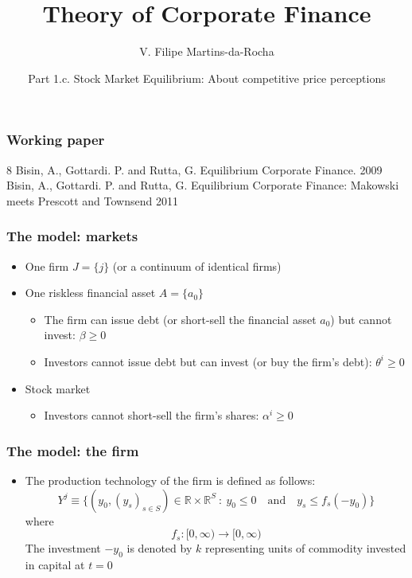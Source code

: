 \documentclass[blue]{beamer}
\title[Corporate Finance]{Theory of Corporate Finance}
\author[Victor Filipe]{V. Filipe Martins-da-Rocha}
\institute[FGV EESP]{Escola de Economia de S\~ao Paulo}
\date[April--June, 2026]{Part 1.c. Stock Market Equilibrium: About competitive price perceptions}
\def\R{\mathbb{R}}
\def\leq{\leqslant}
\def\geq{\geqslant}
\def\et{\quad \textrm{and} \quad}
\theoremstyle{definition}
\theoremstyle{example}
\begin{document}
\frame{\titlepage}
\begin{frame}\frametitle{Working paper}
\begin{thebibliography}{8}
  \beamertemplatearticlebibitems
    Bisin, A., Gottardi. P. and Rutta, G.
    \newblock Equilibrium Corporate Finance.
     2009
    Bisin, A., Gottardi. P. and Rutta, G.
    \newblock Equilibrium Corporate Finance: Makowski meets Prescott and Townsend
     2011
    \end{thebibliography}
\end{frame}
\begin{frame}\frametitle{The model: markets}
\begin{itemize}
\item One firm $J=\{j\}$ (or a continuum of identical firms)
\item One riskless financial asset $A=\{a_0\}$
    \begin{itemize}
    \item The firm can issue debt (or short-sell the financial asset $a_0$) but cannot invest: $\beta \geq 0$
    \item Investors cannot issue debt but can invest (or buy the firm's debt): $\theta^i \geq 0$
    \end{itemize}
\item Stock market
    \begin{itemize}
    \item Investors cannot short-sell the firm's shares: $\alpha^i \geq 0$
    \end{itemize}
\end{itemize}
\end{frame}
\begin{frame}\frametitle{The model: the firm}
\begin{itemize}
\item The production technology of the firm is defined as follows:
\[
Y^j \equiv \{(y_0,(y_s)_{s\in S}) \in \R \times \R^S \ \colon \ y_0 \leq 0 \et y_s\leq f_s(-y_0) \}
\]
where
\[
f_s :[0,\infty) \to [0,\infty)
\]
The investment $-y_0$ is denoted by $k$ representing units of commodity invested in capital at $t=0$
\end{itemize}
\end{frame}
\end{document}
